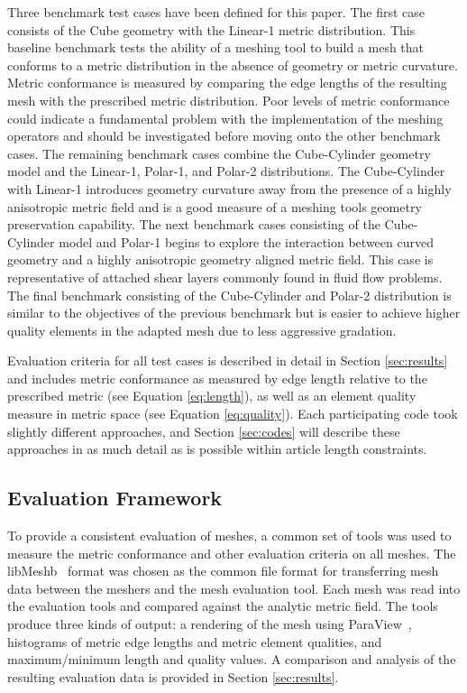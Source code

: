 \documentclass[3p,times,procedia,number]{elsarticle}
\begin{document}
Three benchmark test cases have been defined for this paper.
The first case consists of the Cube geometry with the Linear-1 metric distribution.
This baseline benchmark tests the ability of a meshing tool to build a mesh that conforms to a metric distribution in the absence of geometry or metric curvature.
Metric conformance is measured by comparing the edge lengths of the resulting mesh with the prescribed metric distribution.
Poor levels of metric conformance could indicate a fundamental problem with the implementation of the meshing operators and should be investigated before moving onto the other benchmark cases.
The remaining benchmark cases combine the Cube-Cylinder geometry model and the Linear-1, Polar-1, and Polar-2 distributions.
The Cube-Cylinder with Linear-1 introduces geometry curvature away from the presence of a highly anisotropic metric field and is a good measure of a meshing tools geometry preservation capability.
The next benchmark cases consisting of the Cube-Cylinder model and Polar-1 begins to explore the interaction between curved geometry and a highly anisotropic geometry aligned metric field.
This case is representative of attached shear layers commonly found in fluid flow problems.
The final benchmark consisting of the Cube-Cylinder and Polar-2 distribution is similar to the objectives of the previous benchmark but is easier to achieve higher quality elements in the adapted mesh due to less aggressive gradation.  

Evaluation criteria for all test cases is described in detail in Section \ref{sec:results} and includes metric conformance
as measured by edge length relative to the prescribed metric (see Equation \ref{eq:length}),
as well as an element quality measure in metric space (see Equation \ref{eq:quality}).
Each participating code took slightly different approaches, and Section \ref{sec:codes} will
describe these approaches in as much detail as is possible within article length constraints.

\subsection{Evaluation Framework}

To provide a consistent evaluation of meshes, a common set of tools was used to measure the metric conformance and other evaluation criteria on all meshes.
The libMeshb~\cite{libMeshb-website} format was chosen as the common file format for transferring mesh data between the meshers and the mesh evaluation tool.
Each mesh was read into the evaluation tools and compared against the analytic metric field.
The tools produce three kinds of output: a rendering of the mesh using ParaView~\cite{paraview-book},
histograms of metric edge lengths and metric element qualities, and maximum/minimum length
and quality values.
A comparison and analysis of the resulting evaluation data is provided in Section \ref{sec:results}.
\end{document}

